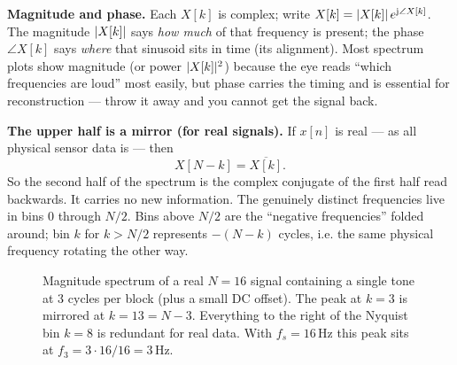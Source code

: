 \textbf{Magnitude and phase.} Each $X[k]$ is complex; write $X[k] = \lvert X[k]\rvert\,
e^{\mathrm{j}\angle X[k]}$. The magnitude $\lvert X[k]\rvert$ says \emph{how much} of that
frequency is present; the phase $\angle X[k]$ says \emph{where} that sinusoid sits
in time (its alignment). Most spectrum plots show magnitude (or power
$\lvert X[k]\rvert^2$) because the eye reads ``which frequencies are loud'' most easily,
but phase carries the timing and is essential for reconstruction --- throw it away
and you cannot get the signal back.

\textbf{The upper half is a mirror (for real signals).} If $x[n]$ is real --- as
all physical sensor data is --- then
\[
X[N-k] = \overline{X[k]}.
\]
So the second half of the spectrum is the complex conjugate of the first half
read backwards. It carries no new information. The genuinely distinct frequencies
live in bins $0$ through $N/2$. Bins above $N/2$ are the ``negative frequencies''
folded around; bin $k$ for $k > N/2$ represents $-(N-k)$ cycles, i.e. the
same physical frequency rotating the other way.

\begin{figure}[H]
\centering
{}
\caption{Magnitude spectrum of a real $N=16$ signal containing a single tone at
$3$ cycles per block (plus a small DC offset). The peak at $k=3$ is mirrored at
$k=13=N-3$. Everything to the right of the Nyquist bin $k=8$ is redundant for real
data. With $f_s = 16$\,Hz this peak sits at $f_3 = 3\cdot 16/16 = 3$\,Hz.}
\label{ch08:fig-spectrum}
\end{figure}

